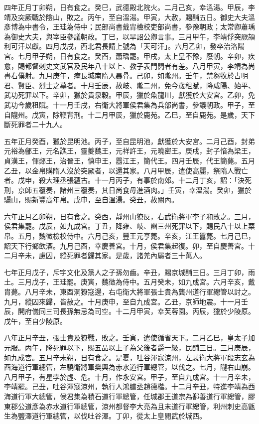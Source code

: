 \begin{pinyinscope}
 四年正月丁卯朔，日有食之。癸巳，武德殿北院火。二月己亥，幸溫湯。甲辰，李靖及突厥戰於陰山，敗之。丙午，至自溫湯。甲寅，大赦，賜酺五日。御史大夫溫彥博為中書令，王珪為侍中；民部尚書戴胄檢校吏部尚書，參豫朝政；太常卿蕭瑀為御史大夫，與宰臣參議朝政。丁巳，以旱詔公卿言事。三月甲午，李靖俘突厥頡利可汗以獻。四月戊戌，西北君長請上號為「天可汗」。六月乙卯，發卒治洛陽宮。七月甲子朔，日有食之。癸酉，蕭瑀罷。甲戌，太上皇不豫，廢朝。辛卯，疾愈，賜都督刺史文武官及民年八十以上、教子表門閭者有差。八月甲寅，李靖為尚書右僕射。九月庚午，瘞長城南隋人暴骨。己卯，如隴州。壬午，禁芻牧於古明君、賢臣、烈士之墓者。十月壬辰，赦岐、隴二州，免今歲租賦，降咸陽、始平、武功死罪以下。辛卯，獵於貴泉穀。甲辰，獵於魚龍川，獻獲於大安宮。乙卯，免武功今歲租賦。十一月壬戌，右衛大將軍侯君集為兵部尚書，參議朝政。甲子，至自隴州。戊寅，除鞭背刑。十二月甲辰，獵於鹿苑。乙巳，至自鹿苑。是歲，天下斷死罪者二十九人。



 五年正月癸酉，獵於昆明池。丙子，至自昆明池，獻獲於大安宮。二月己酉，封弟元裕為鄶王，元名譙王，靈夔魏王，元祥許王，元曉密王。庚戌，封子愔為梁王，貞漢王，惲郯王，治晉王，慎申王，囂江王，簡代王。四月壬辰，代王簡薨。五月乙丑，以金帛購隋人沒於突厥者，以還其家。八月甲辰，遣使高麗，祭隋人戰亡者。戊申，殺大理丞張蘊古。十一月丙子，有事於南郊。十二月丁亥，詔：「決死刑，京師五覆奏，諸州三覆奏，其日尚食毋進酒肉。」壬寅，幸溫湯。癸卯，獵於驪山，賜新豐高年帛。戊申，至自溫湯。癸丑，赦關內。



 六年正月乙卯朔，日有食之。癸西，靜州山獠反，右武衛將軍李子和敗之。三月，侯君集罷。戊辰，如九成宮。丁丑，降雍、岐、豳三州死罪以下，賜民八十以上粟帛。五月，魏徵檢校侍中。六月己亥，豐王元亨薨。辛亥，江王囂薨。七月己巳，詔天下行鄉飲酒。九月己酉，幸慶善宮。十月，侯君集起復。卯，至自慶善宮。十二月辛未，慮囚，縱死罪者歸其家。是歲，諸羌內屬者三十萬人。



 七年正月戊子，斥宇文化及黨人之子孫勿齒。辛丑，賜京城酺三日。三月丁卯，雨土。三月戊子，王珪罷。庚寅，魏徵為侍中。五月癸未，如九成宮。六月辛亥，戴胄薨。八月辛未，東酉洞獠寇邊，右屯衛大將軍張士貴為龔州道行軍總管以討之。九月，縱囚來歸，皆赦之。十月庚申，至自九成宮。乙丑，京師地震。十一月壬辰，開府儀同三司長孫無忌為司空。十二月甲寅，幸芙蓉園。丙辰，獵於少陵原。戊午，至自少陵原。



 八年正月辛丑，張士貴及獠戰，敗之。壬寅，遣使循省天下。二月乙巳，皇太子加元服。丙午，降死罪以下，賜五品以上子為父後者爵一級，民酺三日。三月庚辰，如九成宮。五月辛未朔，日有食之。是夏，吐谷渾寇涼州，左驍衛大將軍段志玄為酉海道行軍總管，左驍衛將軍樊興為赤水道行軍總管，以伐之。七月，隴右山崩。八月甲子，有星孛於虛、危。十月，作永安宮。甲子，至自九成宮。十一月辛未，李靖罷。己丑，吐谷渾寇涼州，執行人鴻臚丞趙德楷。十二月辛丑，特進李靖為西海道行軍大總管，侯君集為積石道行軍總管，任城郡王道宗為鄯善道行軍總管，膠東郡公道彥為赤水道行軍總管，涼州都督李大亮為且末道行軍總管，利州刺史高甑生為鹽澤道行軍總管，以伐吐谷渾。丁卯，從太上皇閱武於城西。




\end{pinyinscope}
